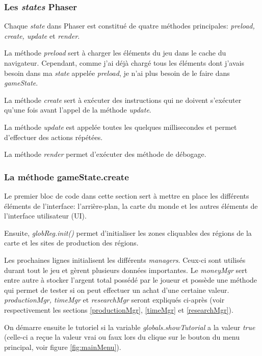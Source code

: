 \documentclass{article}
\begin{document}
		\subsubsection{Les \textit{states} Phaser}
		Chaque \textit{state} dans Phaser est constitué de quatre méthodes principales: \textit{preload, create, update} et \textit{render}. 
		
		
		La méthode \textit{preload} sert à charger les éléments du jeu dans le cache du navigateur. Cependant, comme j'ai déjà chargé tous les éléments dont j'avais besoin dans ma \textit{state} appelée \textit{preload}, je n'ai plus besoin de le faire dans \textit{gameState}.  
		
		
		La méthode \textit{create} sert à exécuter des instructions qui ne doivent s'exécuter qu'une fois avant l'appel de la méthode \textit{update}.
		
		
		La méthode \textit{update} est appelée toutes les quelques millisecondes et permet d'effectuer des actions répétées.
		
		
		La méthode \textit{render} permet d'exécuter des méthode de débogage.
		
		\subsubsection{La méthode gameState.create}
		Le premier bloc de code dans cette section sert à mettre en place les différents éléments de l'interface: l'arrière-plan, la carte du monde et les autres éléments de l'interface utilisateur (UI).
		
		
		Ensuite, \textit{globReg.init()} permet d'initialiser les zones cliquables des régions de la carte et les sites de production des régions.
		
		
		Les prochaines lignes initialisent les différents \textit{managers}. Ceux-ci sont utilisés durant tout le jeu et gèrent plusieurs données importantes. Le \textit{moneyMgr} sert entre autre à stocker l'argent total possédé par le joueur et possède une méthode qui permet de tester si on peut effectuer un achat d'une certaine valeur. \textit{productionMgr, timeMgr} et \textit{researchMgr} seront expliqués ci-après (voir respectivement les sections \ref{productionMgr}, \ref{timeMgr} et \ref{researchMgr}).
		
		
		On démarre ensuite le tutoriel si la variable \textit{globals.showTutorial} a la valeur \textit{true} (celle-ci a reçue la valeur vrai ou faux lors du clique sur le bouton du menu principal, voir figure \ref{fig:mainMenu}).
		
\end{document}
